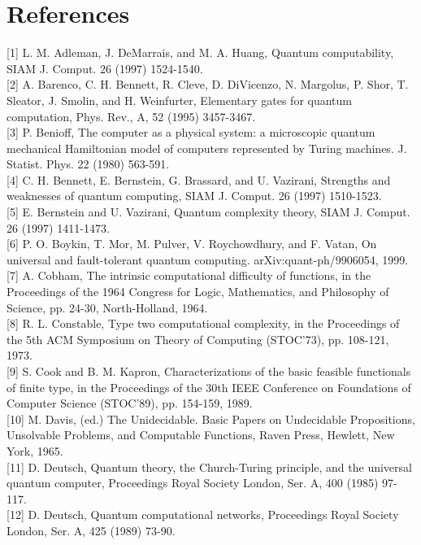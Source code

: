 \documentclass[10pt]{article}
\begin{document}
\section*{References}
[1] L. M. Adleman, J. DeMarrais, and M. A. Huang, Quantum computability, SIAM J. Comput. 26 (1997) 1524-1540.\\[0pt]
[2] A. Barenco, C. H. Bennett, R. Cleve, D. DiVicenzo, N. Margolus, P. Shor, T. Sleator, J. Smolin, and H. Weinfurter, Elementary gates for quantum computation, Phys. Rev., A, 52 (1995) 3457-3467.\\[0pt]
[3] P. Benioff, The computer as a physical system: a microscopic quantum mechanical Hamiltonian model of computers represented by Turing machines. J. Statist. Phys. 22 (1980) 563-591.\\[0pt]
[4] C. H. Bennett, E. Bernstein, G. Brassard, and U. Vazirani, Strengths and weaknesses of quantum computing, SIAM J. Comput. 26 (1997) 1510-1523.\\[0pt]
[5] E. Bernstein and U. Vazirani, Quantum complexity theory, SIAM J. Comput. 26 (1997) 1411-1473.\\[0pt]
[6] P. O. Boykin, T. Mor, M. Pulver, V. Roychowdhury, and F. Vatan, On universal and fault-tolerant quantum computing. arXiv:quant-ph/9906054, 1999.\\[0pt]
[7] A. Cobham, The intrinsic computational difficulty of functions, in the Proceedings of the 1964 Congress for Logic, Mathematics, and Philosophy of Science, pp. 24-30, North-Holland, 1964.\\[0pt]
[8] R. L. Constable, Type two computational complexity, in the Proceedings of the 5th ACM Symposium on Theory of Computing (STOC'73), pp. 108-121, 1973.\\[0pt]
[9] S. Cook and B. M. Kapron, Characterizations of the basic feasible functionals of finite type, in the Proceedings of the 30th IEEE Conference on Foundations of Computer Science (STOC'89), pp. 154-159, 1989.\\[0pt]
[10] M. Davis, (ed.) The Unidecidable. Basic Papers on Undecidable Propositions, Unsolvable Problems, and Computable Functions, Raven Press, Hewlett, New York, 1965.\\[0pt]
[11] D. Deutsch, Quantum theory, the Church-Turing principle, and the universal quantum computer, Proceedings Royal Society London, Ser. A, 400 (1985) 97-117.\\[0pt]
[12] D. Deutsch, Quantum computational networks, Proceedings Royal Society London, Ser. A, 425 (1989) 73-90.\\[0pt]
\end{document}
